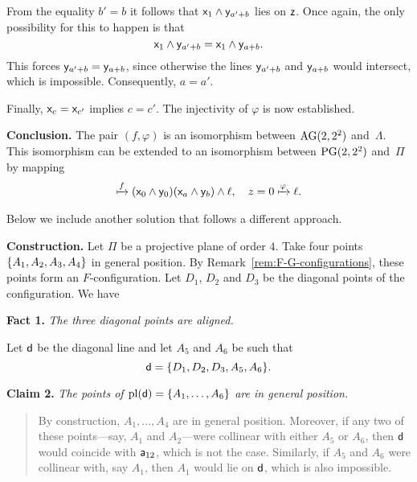 \begin{solution}
\begin{description}
        From the equality $b' = b$ it follows that $\mathsf x_1\wedge\mathsf y_{a'+b}$ lies on $\mathsf z$. Once again, the only possibility for this to happen is that
        \[
        \mathsf x_1\wedge\mathsf y_{a'+b} = \mathsf x_1\wedge\mathsf y_{a+b}.
        \]
        This forces $\mathsf y_{a'+b} = \mathsf y_{a+b}$, since otherwise the lines $\mathsf y_{a'+b}$ and $\mathsf y_{a+b}$ would intersect, which is impossible. Consequently, $a = a'$.
        
        Finally, $\mathsf x_c = \mathsf x_{c'}$ implies $c = c'$. The injectivity of $\varphi$ is now established.

        \medskip

        \textbf{Conclusion.} The pair $(f,\varphi)$ is an isomorphism between $\operatorname{AG}(2,2^2)$ and~$\Lambda$. This isomorphism can be extended to an isomorphism between $\operatorname{PG}(2,2^2)$ and~$\Pi$ by mapping
        \begin{align*}
            [a:b:0]\xmapsto f
                (\block x_0\wedge\block y_0)
                (\block x_a\wedge\block y_b)\wedge\ell,
                \quad
            z=0\xmapsto\varphi\ell.
        \end{align*}

        Below we include another solution that follows a different approach.
        
        \textbf{Construction.} \citep{cuypers} Let $\Pi$ be a projective plane of order $4$. Take four points $\{A_1,A_2,A_3,A_4\}$ in general position. By Remark~\ref{rem:F-G-configurations}, these points form an $F$-configuration. Let $D_1$, $D_2$ and $D_3$ be the diagonal points of the configuration. We have
        
        \textbf{Fact 1.} \textit{The three diagonal points are aligned.}
        
        Let $\mathsf d$ be the diagonal line and let $A_5$ and $A_6$ be such that
        \[
            \mathsf d=\{D_1,D_2,D_3,A_5,A_6\}.
        \]

        \textbf{Claim 2.} \textit{The points of\/ $\operatorname{pl}(\mathsf d)=\{A_1,\dots,A_6\}$ are in general position.}

        \begin{quote}
            By construction, $A_1, \dots, A_4$ are in general position. Moreover, if any two of these points—say, $A_1$ and $A_2$—were collinear with either $A_5$ or $A_6$, then $\mathsf d$ would coincide with $\mathsf a_{12}$, which is not the case. Similarly, if $A_5$ and $A_6$ were collinear with, say $A_1$, then $A_1$ would lie on $\mathsf d$, which is also impossible.
        \end{quote}


\end{description}
\end{solution}
